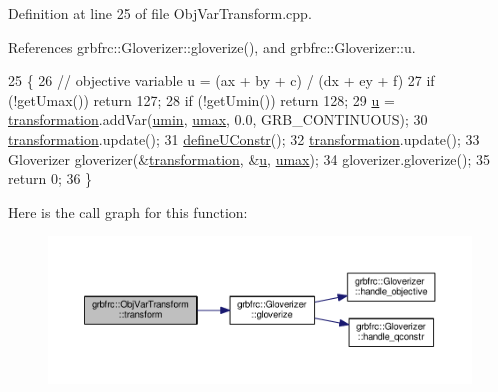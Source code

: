 Definition at line 25 of file Obj\+Var\+Transform.\+cpp.



References grbfrc\+::\+Gloverizer\+::gloverize(), and grbfrc\+::\+Gloverizer\+::u.


\begin{DoxyCode}
25                                \{
26     \textcolor{comment}{// objective variable u = (ax + by + c) / (dx + ey + f)}
27     \textcolor{keywordflow}{if} (!getUmax()) \textcolor{keywordflow}{return} 127;
28     \textcolor{keywordflow}{if} (!getUmin()) \textcolor{keywordflow}{return} 128;
29     \hyperlink{classgrbfrc_1_1ObjVarTransform_a611963103bbe1da24e2a505dcb766b34}{u} = \hyperlink{classgrbfrc_1_1ObjVarTransform_a97ea0a63c0b947d4dbdd417e543f88c2}{transformation}.addVar(\hyperlink{classgrbfrc_1_1ObjVarTransform_a802dc63945284b97ea3b2da08b29f0b1}{umin}, \hyperlink{classgrbfrc_1_1ObjVarTransform_a1295b4a0d4772f72e7acb3a7cf03184c}{umax}, 0.0, GRB\_CONTINUOUS);
30     \hyperlink{classgrbfrc_1_1ObjVarTransform_a97ea0a63c0b947d4dbdd417e543f88c2}{transformation}.update();
31     \hyperlink{classgrbfrc_1_1ObjVarTransform_a13b170b85ba3412e2938951e13f040ad}{defineUConstr}();
32     \hyperlink{classgrbfrc_1_1ObjVarTransform_a97ea0a63c0b947d4dbdd417e543f88c2}{transformation}.update();
33     Gloverizer gloverizer(&\hyperlink{classgrbfrc_1_1ObjVarTransform_a97ea0a63c0b947d4dbdd417e543f88c2}{transformation}, &\hyperlink{classgrbfrc_1_1ObjVarTransform_a611963103bbe1da24e2a505dcb766b34}{u}, \hyperlink{classgrbfrc_1_1ObjVarTransform_a1295b4a0d4772f72e7acb3a7cf03184c}{umax});
34     gloverizer.gloverize();
35     \textcolor{keywordflow}{return} 0;
36 \}
\end{DoxyCode}


Here is the call graph for this function\+:
\nopagebreak
\begin{figure}[H]
\begin{center}
\leavevmode
\includegraphics[width=350pt]{classgrbfrc_1_1ObjVarTransform_a34378e1e49b4cd057a4e388699a83ee8_cgraph}
\end{center}
\end{figure}


